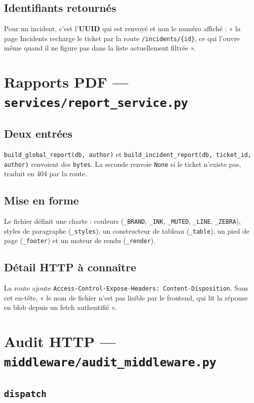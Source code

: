 \documentclass[11pt,a4paper]{report}
\newcommand{\file}[1]{\texttt{\small #1}}
\newcommand{\fn}[1]{\texttt{\small\textcolor{oasisviolet}{#1}}}
\newcommand{\route}[1]{\texttt{\small\textcolor{oasisgreen}{#1}}}
\begin{document}
\subsection*{Identifiants retournés}
Pour un incident, c'est l'\textbf{UUID} qui est renvoyé et non le numéro
affiché : « la page Incidents recharge le ticket par la route
\route{/incidents/\{id\}}, ce qui l'ouvre même quand il ne figure pas dans la
liste actuellement filtrée ».

\section{Rapports PDF --- \file{services/report\_service.py}}

\subsection*{Deux entrées}
\fn{build\_global\_report(db, author)} et
\fn{build\_incident\_report(db, ticket\_id, author)} renvoient des
\texttt{bytes}. La seconde renvoie \texttt{None} si le ticket n'existe pas,
traduit en 404 par la route.

\subsection*{Mise en forme}
Le fichier définit une charte : couleurs (\texttt{\_BRAND}, \texttt{\_INK},
\texttt{\_MUTED}, \texttt{\_LINE}, \texttt{\_ZEBRA}), styles de paragraphe
(\fn{\_styles}), un constructeur de tableau (\fn{\_table}), un pied de page
(\fn{\_footer}) et un moteur de rendu (\fn{\_render}).

\subsection*{Détail HTTP à connaître}
La route ajoute \texttt{Access-Control-Expose-Headers: Content-Disposition}.
Sans cet en-tête, « le nom de fichier n'est pas lisible par le frontend, qui lit
la réponse en blob depuis un fetch authentifié ».

\section{Audit HTTP --- \file{middleware/audit\_middleware.py}}

\subsection*{\fn{dispatch}}
\end{document}
